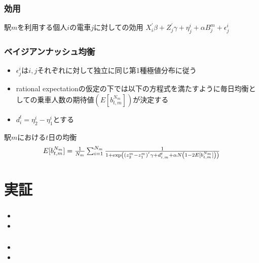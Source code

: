 \documentclass[dvipdfmx, 12pt]{beamer}
\begin{document}
\begin{frame}\frametitle{効用}
	\begin{itembox}[l]{駅$m$を利用する個人$i$の電車$j$に対しての効用}
		$X_i^{'}\beta + Z_j^{'}\gamma + \eta_j^i + \alpha B_j^m + \epsilon_j^i$
	\end{itembox}
\end{frame}

\begin{frame}\frametitle{ベイジアンナッシュ均衡}
	\begin{itemize}
		\item $\epsilon_j^i$は$i, j$それぞれに対して独立に同じ第1種極値分布に従う
		\item rational expectationの仮定の下では以下の方程式を満たすように毎日均衡としての乗車人数の期待値$(E[b_{t,m}^{N_m}])$が決定する
		\item $d_i^t = \eta_2^i - \eta_1^i$とする
	\end{itemize}
	\begin{itembox}[l]{駅$m$における$t$日の均衡}
		\begin{align*}
		\scalebox{1}{$
                	E[b_{t,m}^{N_m}] = \frac{1}{N_m} \sum_{i = 1}^{N_m} \frac{1}{1 + \exp\left( (z_2^m - z_1^m)^{'}\gamma + d_{i.m}^t + \alpha N \left(1 - 2E[b_{t,m}^{N_m}]\right) \right)} $}
                \end{align*}
	\end{itembox}
\end{frame}

\section{実証}
\begin{frame}\frametitle{}
	\begin{itemize}
		\item 
		\item 
	\end{itemize}
\end{frame}

\begin{frame}\frametitle{}
	\begin{itemize}
		\item 
		\item 
	\end{itemize}
\end{frame}
\end{document}
